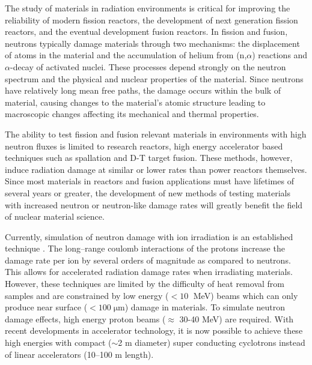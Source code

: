 \documentclass[final,3p,times,twocolumn]{elsarticle} %
\begin{document}
The study of materials in radiation environments is critical for improving the reliability of modern fission reactors, the development of next generation fission reactors, and the eventual development fusion reactors.  In fission and fusion, neutrons typically damage materials through two mechanisms: the displacement of atoms in the material and the accumulation of helium from (n,$\alpha$) reactions and $\alpha$-decay of activated nuclei.  These processes depend strongly on the neutron spectrum and the physical and nuclear properties of the material.  Since neutrons have relatively long mean free paths, the damage occurs within the bulk of material, causing changes to the material's atomic structure leading to macroscopic changes affecting its mechanical and thermal properties.  

The ability to test fission and fusion relevant materials in environments with high neutron fluxes is limited to research reactors, high energy accelerator based techniques such as spallation and D-T target fusion.  These methods, however, induce radiation damage at similar or lower rates than power reactors themselves.  Since most materials in reactors and fusion applications must have lifetimes of several years or greater, the development of new methods of testing materials with increased neutron or neutron-like damage rates will greatly benefit the field of nuclear material science. 

Currently, simulation of neutron damage with ion irradiation is an established technique \cite{Was,ASTME521}.  The long--range coulomb interactions of the protons increase the damage rate per ion by several orders of magnitude as compared to neutrons. This allows for accelerated radiation damage rates when irradiating materials.  However, these techniques are limited by the difficulty of heat removal from samples and are constrained by low energy ($<10\;$ MeV) beams which can only produce near surface ($<100\;\mathrm{\mu m}$) damage in materials.  To simulate neutron damage effects, high energy proton beams ($\approx$ 30-40 MeV) are required. With recent developments in accelerator technology, it is now possible to achieve these high energies with compact ($\sim$2 m diameter) super conducting cyclotrons instead of linear accelerators (10--100 m length).
\end{document}

